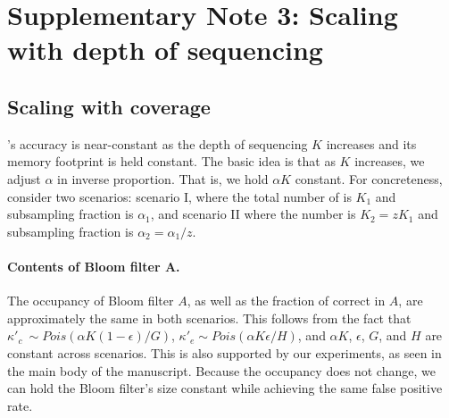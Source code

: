 \documentclass[10pt]{article}
\begin{document}
\section*{Supplementary Note 3: Scaling with depth of sequencing}

\subsection*{Scaling with coverage}
\tool's accuracy is near-constant as the depth of sequencing $K$ increases and its memory footprint is held constant.  The basic idea is that as $K$ increases, we adjust $\alpha$ in inverse proportion.  That is, we hold $\alpha K$ constant.  For concreteness, consider two scenarios: scenario I, where the total number of \kmers is $K_1$ and subsampling fraction is $\alpha_1$, and scenario II where the number is $K_2=z K_1$ and subsampling fraction is $\alpha_2 = \alpha_1 / z$.

\paragraph{Contents of Bloom filter A.} The occupancy of Bloom filter $A$, as well as the fraction of correct \kmers in $A$, are approximately the same in both scenarios.  This follows from the fact that $\kappa'_c ~ \sim Pois(\alpha K (1 - \epsilon) / G)$, $\kappa'_e \sim Pois(\alpha K \epsilon / H)$, and $\alpha K$, $\epsilon$, $G$, and $H$ are constant across scenarios.  This is also supported by our experiments, as seen in the main body of the manuscript.  Because the occupancy does not change, we can hold the Bloom filter's size constant while achieving the same false positive rate.

\end{document}
